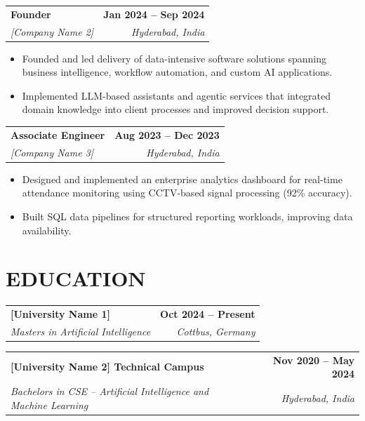 \documentclass[a4paper,11pt]{article}
\makeatletter
\newcommand{\entryheader}[4]{%
  \begin{tabularx}{\textwidth}{@{}>{\RaggedRight\arraybackslash}X r@{}}
    \textbf{#1} & \textbf{#2} \\
    \textit{#3} & \textit{#4} \\
  \end{tabularx}%
}
\newenvironment{entrybullets}{%
  \begin{minipage}[t]{0.77\textwidth}
    \begin{itemize}[leftmargin=*,label=\textbullet,align=left]
}{%
    \end{itemize}
  \end{minipage}
}
\makeatother
\begin{document}
\vspace{0.25cm}
\entryheader{Founder}{Jan 2024 -- Sep 2024}{[Company Name 2]}{Hyderabad, India}
\begin{entrybullets}
  \item Founded and led delivery of data-intensive software solutions spanning business intelligence, workflow automation, and custom AI applications.
  \item Implemented LLM-based assistants and agentic services that integrated domain knowledge into client processes and improved decision support.
\end{entrybullets}

\vspace{0.25cm}
\entryheader{Associate Engineer}{Aug 2023 -- Dec 2023}{[Company Name 3]}{Hyderabad, India}
\begin{entrybullets}
  \item Designed and implemented an enterprise analytics dashboard for real-time attendance monitoring using CCTV-based signal processing (92\% accuracy).
  \item Built SQL data pipelines for structured reporting workloads, improving data availability.
\end{entrybullets}

\section*{EDUCATION}
\begin{tabularx}{\textwidth}{@{}X r@{}}
  \textbf{[University Name 1]} & \textbf{Oct 2024 -- Present} \\
  \textit{Masters in Artificial Intelligence} & \textit{Cottbus, Germany} \\
\end{tabularx}

\vspace{0.25cm}
\begin{tabularx}{\textwidth}{@{}X r@{}}
  \textbf{[University Name 2] Technical Campus} & \textbf{Nov 2020 -- May 2024} \\
  \textit{Bachelors in CSE -- Artificial Intelligence and Machine Learning} & \textit{Hyderabad, India} \\
\end{tabularx}
\end{document}
